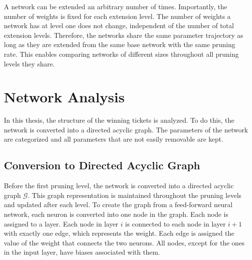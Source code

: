 A network can be extended an arbitrary number of times.
Importantly, the number of weights is fixed for each extension level.
The number of weights a network has at level one does not change, independent of the number of total extension levels.
Therefore, the networks share the same parameter trajectory as long as they are extended from the same base network with the same pruning rate.
This enables comparing networks of different sizes throughout all pruning levels they share.



\section{Network Analysis}
In this thesis, the structure of the winning tickets is analyzed.
To do this, the network is converted into a directed acyclic graph.
The parameters of the network are categorized and all parameters that are not easily removable are kept.
 
\subsection{Conversion to Directed Acyclic Graph}
Before the first pruning level, the network is converted into a directed acyclic graph $\mathcal{G}$.
This graph representation is maintained throughout the pruning levels and updated after each level.
To create the graph from a feed-forward neural network, each neuron is converted into one node in the graph.
Each node is assigned to a layer.
Each node in layer $i$ is connected to each node in layer $i+1$ with exactly one edge, which represents the weight.
Each edge is assigned the value of the weight that connects the two neurons.
All nodes, except for the ones in the input layer, have biases associated with them.

